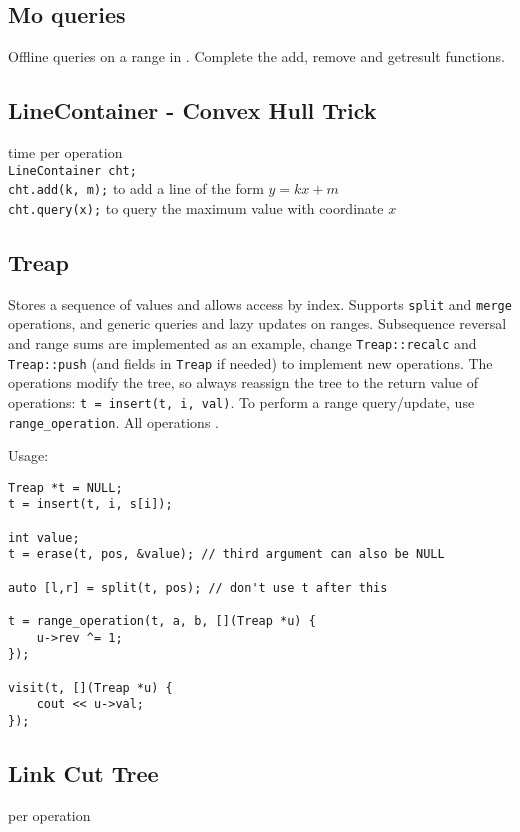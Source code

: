 \subsection{Mo queries}
Offline queries on a range in . Complete the add, remove and getresult functions.

\subsection{LineContainer - Convex Hull Trick}

 time per operation \\
\verb|LineContainer cht;| \\
\verb|cht.add(k, m);| to add a line of the form $y = kx + m$ \\
\verb|cht.query(x);| to query the maximum value with coordinate $x$

\subsection{Treap}

Stores a sequence of values and allows access by index. Supports \texttt{split} and \texttt{merge} operations, and generic queries and lazy updates on ranges. Subsequence reversal and range sums are implemented as an example, change \texttt{Treap::recalc} and \texttt{Treap::push} (and fields in \texttt{Treap} if needed) to implement new operations.
The operations modify the tree, so always reassign the tree to the return value of operations: \texttt{t = insert(t, i, val)}. To perform a range query/update, use \texttt{range\_operation}.
All operations .

Usage:
\begin{lstlisting}
Treap *t = NULL;
t = insert(t, i, s[i]);

int value;
t = erase(t, pos, &value); // third argument can also be NULL

auto [l,r] = split(t, pos); // don't use t after this

t = range_operation(t, a, b, [](Treap *u) {
	u->rev ^= 1;
});

visit(t, [](Treap *u) {
	cout << u->val;
});
\end{lstlisting}


\subsection{Link Cut Tree}
 per operation
